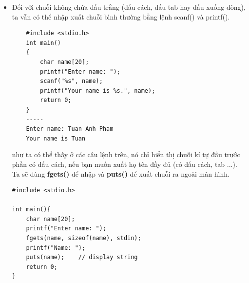 \documentclass[12pt,a4paper]{article}
\begin{document}
\begin{itemize}
	\item Đối với chuỗi không chứa dấu trắng (dấu cách, dấu tab hay dấu xuống dòng), ta vẫn có thể nhập xuất chuỗi bình thường bằng lệnh scanf() và printf().  
\begin{lstlisting}
	#include <stdio.h>
	int main()
	{
    	char name[20];
    	printf("Enter name: ");
    	scanf("%s", name);
    	printf("Your name is %s.", name);
    	return 0;
	}
	-----
	Enter name: Tuan Anh Pham
	Your name is Tuan
\end{lstlisting}
như ta có thể thấy ở các câu lệnh trên, nó chỉ hiển thị chuỗi kí tự đầu trước phần có dấu cách, nếu bạn muốn xuất họ tên đầy đủ (có dấu cách, tab ...). Ta sẽ dùng \textbf{fgets()} để nhập và \textbf{puts()} để xuất chuỗi ra ngoài màn hình.
\begin{lstlisting}
#include <stdio.h>

int main(){
    char name[20];
    printf("Enter name: ");
    fgets(name, sizeof(name), stdin); 
    printf("Name: ");
    puts(name);    // display string
    return 0;
}
\end{lstlisting}
\end{itemize}
\end{document}
